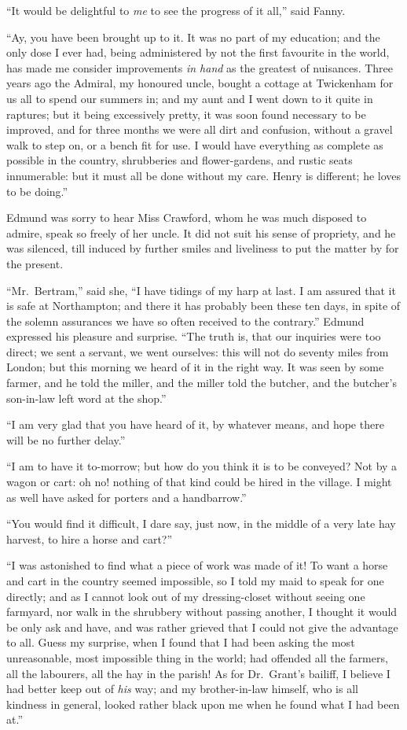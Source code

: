 ``It would be delightful to \emph{me} to see the progress
of it all,'' said Fanny.

``Ay, you have been brought up to it.  It was no part of
my education; and the only dose I ever had, being administered
by not the first favourite in the world, has made me consider
improvements \emph{in hand} as the greatest of nuisances.
Three years ago the Admiral, my honoured uncle, bought a
cottage at Twickenham for us all to spend our summers in;
and my aunt and I went down to it quite in raptures;
but it being excessively pretty, it was soon found
necessary to be improved, and for three months we were
all dirt and confusion, without a gravel walk to step on,
or a bench fit for use.  I would have everything as complete
as possible in the country, shrubberies and flower-gardens,
and rustic seats innumerable:  but it must all be done
without my care.  Henry is different; he loves to be doing.''

Edmund was sorry to hear Miss Crawford, whom he was much
disposed to admire, speak so freely of her uncle.
It did not suit his sense of propriety, and he was silenced,
till induced by further smiles and liveliness to put
the matter by for the present.

``Mr.\ Bertram,'' said she, ``I have tidings of my harp at last.
I am assured that it is safe at Northampton; and there it
has probably been these ten days, in spite of the solemn
assurances we have so often received to the contrary.''
Edmund expressed his pleasure and surprise.  ``The truth is,
that our inquiries were too direct; we sent a servant,
we went ourselves:  this will not do seventy miles from London;
but this morning we heard of it in the right way.
It was seen by some farmer, and he told the miller,
and the miller told the butcher, and the butcher's
son-in-law left word at the shop.''

``I am very glad that you have heard of it, by whatever means,
and hope there will be no further delay.''

``I am to have it to-morrow; but how do you think it
is to be conveyed?  Not by a wagon or cart:  oh no!
nothing of that kind could be hired in the village.
I might as well have asked for porters and a handbarrow.''

``You would find it difficult, I dare say, just now,
in the middle of a very late hay harvest, to hire a horse
and cart?''

``I was astonished to find what a piece of work was made of it!
To want a horse and cart in the country seemed impossible,
so I told my maid to speak for one directly; and as I cannot
look out of my dressing-closet without seeing one farmyard,
nor walk in the shrubbery without passing another,
I thought it would be only ask and have, and was rather
grieved that I could not give the advantage to all.
Guess my surprise, when I found that I had been asking
the most unreasonable, most impossible thing in the world;
had offended all the farmers, all the labourers,
all the hay in the parish!  As for Dr.\ Grant's bailiff,
I believe I had better keep out of \emph{his} way; and my
brother-in-law himself, who is all kindness in general,
looked rather black upon me when he found what I had
been at.''

